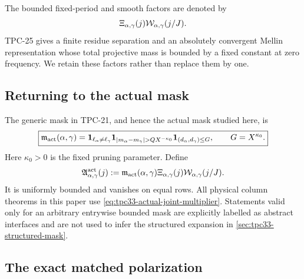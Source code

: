 The bounded fixed-period and smooth factors are denoted by
\begin{equation}
 \Xi_{\alpha,\gamma}(j)
 \mathcal W_{\alpha,\gamma}(j/J).
 \label{eq:tpc33-smooth-residue-factor}
\end{equation}
TPC-25 gives a finite residue separation and an absolutely convergent
Mellin representation whose total projective mass is bounded by a fixed
constant at zero frequency.  We retain these factors rather than replace
them by one.

\subsection{Returning to the actual mask}

The generic mask in TPC-21, and hence the actual mask studied here, is
\begin{equation}
 \boxed{
 \mathfrak m_{\rm act}(\alpha,\gamma)
 =\one_{\ell_\alpha\ne\ell_\gamma}
  \one_{|m_\alpha-m_\gamma|>QX^{-\kappa_0}}
  \one_{(d_\alpha,d_\gamma)\le G},
 \qquad G=X^{\kappa_0}.}
 \label{eq:tpc33-actual-mask}
\end{equation}
Here \(\kappa_0>0\) is the fixed pruning parameter.  Define
\begin{equation}
 \mathfrak A_{\alpha,\gamma}^{\rm act}(j)
 :=\mathfrak m_{\rm act}(\alpha,\gamma)
   \Xi_{\alpha,\gamma}(j)
   \mathcal W_{\alpha,\gamma}(j/J).
 \label{eq:tpc33-actual-joint-multiplier}
\end{equation}
It is uniformly bounded and vanishes on equal rows.  All physical
column theorems in this paper use
\eqref{eq:tpc33-actual-joint-multiplier}.  Statements valid only for an
arbitrary entrywise bounded mask are explicitly labelled as abstract
interfaces and are not used to infer the structured expansion in
\cref{sec:tpc33-structured-mask}.

\subsection{The exact matched polarization}

